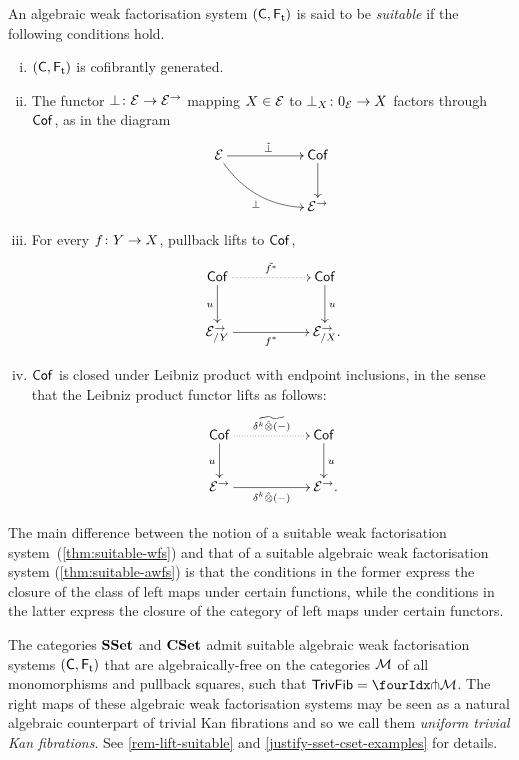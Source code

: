 \documentclass[reqno,10pt,a4paper,oneside,draft]{amsart}
\begin{document}
{{\begin{definition} \label{thm:suitable-awfs}
An algebraic weak factorisation system $(\CC, \TF)$ is said to be \emph{suitable} if the following conditions hold.
\begin{enumerate}[(i)]
\item $(\CC, \TF)$ is cofibrantly generated.
\item The functor $\bot \co \cal{E} \to \cal{E}^\to$ mapping $X \in \cal{E}$ to $\bot_X \co 0_{\cal{E}} \to X$ factors through
$\Cof$, as in the diagram
\[
\xymatrix@C+3em{
\catE \ar[r]^{\tilde{\bot}} \ar@/_1pc/[dr]_{\bot} & \Cof \ar[d] \\
  & \catE^\to}
\]
\item For every $f \co Y \to X$, pullback lifts to $\Cof$, 
\[
\xymatrix@C+3em{
  \Cof
  \ar@{.>}[r]^{\tilde{f^*}}
  \ar[d]_{u}
&
  \Cof
  \ar[d]^{u}
\\
  \catE^\to_{/Y}
  \ar[r]_{f^*}
&
  \catE^\to_{/X}
\rlap{.}}
\]
\item $\Cof$ is closed under Leibniz product with endpoint inclusions, in the sense that the Leibniz product functor
lifts as follows:
\[
\xymatrix@C+3em{
  \Cof 
  \ar@{.>}[r]^{\widetilde{\kcyl \hatotimes (-)}}
  \ar[d]_{u}
&
 \Cof
  \ar[d]^{u}
\\
  \catE^\to
  \ar[r]_{\kcyl \hatotimes (-)}
&
  \catE^\to
\rlap{.}}
\]
\end{enumerate}
\end{definition}



The main difference between the notion of a suitable weak factorisation system~(\cref{thm:suitable-wfs}) and that of a suitable algebraic
weak factorisation system (\cref{thm:suitable-awfs}) is that the conditions in the former express the closure of the class of left maps under certain functions, while the conditions in the latter express the closure of the category of left maps under certain functors. 

\begin{example} \label{unif-triv-fib-sset}
The categories $\SSet$ and $\CSet$ admit suitable algebraic weak factorisation systems $(\CC, \TF)$ that are algebraically-free on the
categories $\cal{M}$ of all monomorphisms and pullback squares, \ie such that $\TrivFib = \liftr{\cal{M}}$. The right maps of these algebraic weak factorisation systems may
be seen as a natural algebraic counterpart of trivial Kan fibrations and so we call them \emph{uniform trivial Kan fibrations}. See \cref{rem-lift-suitable} and 
\cref{justify-sset-cset-examples} for details. 
\end{example} 


}}
\end{document}
